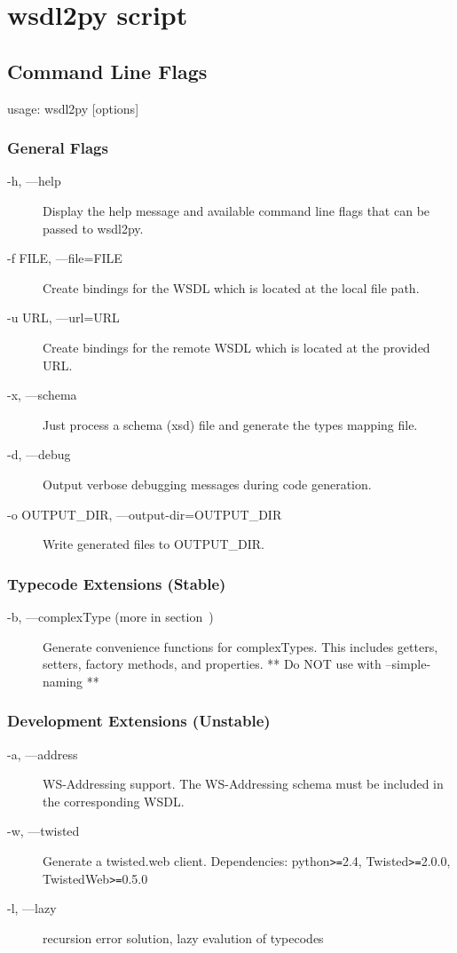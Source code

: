 \chapter{wsdl2py script}

\section{Command Line Flags}
usage: wsdl2py [options]

\subsection{General Flags}
\begin{description}
\item[-h, ---help] Display the help message and available command line
flags that can be passed to wsdl2py.
\item[-f FILE, ---file=FILE] Create bindings for the WSDL which is located at
the local file path.
\item[-u URL, ---url=URL] Create bindings for the remote WSDL which is located
at the provided URL.
\item[-x, ---schema] Just process a schema (xsd) file and generate the types
mapping file.
\item[-d, ---debug] Output verbose debugging messages during code generation.
\item[-o OUTPUT_DIR, ---output-dir=OUTPUT_DIR] Write generated files to OUTPUT_DIR.
\end{description}

\subsection{Typecode Extensions (Stable) }
\begin{description}
\item[-b, ---complexType (more in section~\label{subsubsection:complexType})]
Generate convenience functions for complexTypes.  This includes getters,
setters, factory methods, and properties.  ** Do NOT use with --simple-naming **
\end{description}

\subsection{Development Extensions (Unstable) }
\begin{description}
\item[-a, ---address] WS-Addressing support.  The WS-Addressing schema must be
included in the corresponding WSDL.
\item[-w, ---twisted] Generate a twisted.web client.  Dependencies: 
python\verb!>=!2.4, Twisted\verb!>=!2.0.0, TwistedWeb\verb!>=!0.5.0
\item[-l, ---lazy] recursion error solution, lazy evalution of typecodes
\end{description}

